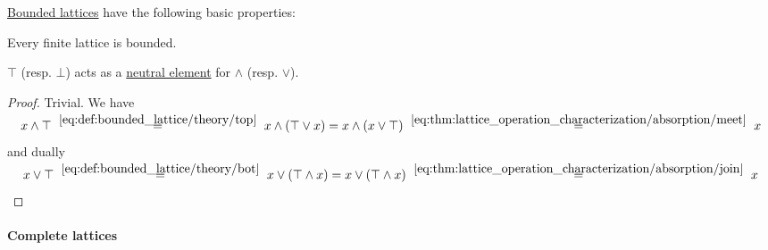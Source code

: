 \begin{proposition}\label{thm:def:bounded_lattice}
  \hyperref[def:bounded_lattice]{Bounded lattices} have the following basic properties:
  \begin{thmenum}
     Every finite lattice is bounded.

     \( \top \) (resp. \( \bot \)) acts as a \hyperref[def:monoid]{neutral element} for \( \wedge \) (resp. \( \vee \)).
  \end{thmenum}
\end{proposition}
\begin{proof}
   Trivial.
   We have
  \begin{equation*}
    x \wedge \top
    \reloset {\eqref{eq:def:bounded_lattice/theory/top}} =
    x \wedge (\top \vee x)
    =
    x \wedge (x \vee \top)
    \reloset {\eqref{eq:thm:lattice_operation_characterization/absorption/meet}} =
    x
  \end{equation*}
  and dually
  \begin{equation*}
    x \vee \top
    \reloset {\eqref{eq:def:bounded_lattice/theory/bot}} =
    x \vee (\top \wedge x)
    =
    x \vee (\top \wedge x)
    \reloset {\eqref{eq:thm:lattice_operation_characterization/absorption/join}} =
    x
  \end{equation*}
\end{proof}

\paragraph{Complete lattices}

